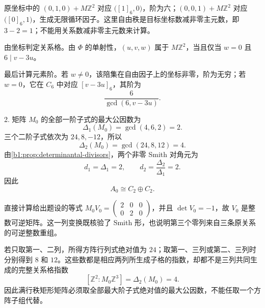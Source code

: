\begin{solution}
	原坐标中的 \((0,1,0)+M\mathbb Z^2\) 对应 \(\bigl([1]_6,0\bigr)\)，阶为六；\((0,0,1)+M\mathbb Z^2\) 对应 \(\bigl([0]_6,1\bigr)\)，生成无限循环因子。这里自由秩是目标坐标数减非零主元数，即 \(3-2=1\)；不能用关系数减非零主元数来计算。

	由坐标判定关系格。由 \(\Phi\) 的单射性，\((u,v,w)\) 属于 \(M\mathbb Z^2\)，当且仅当 \(w=0\) 且 \(6\mid v-3u\)。

	最后计算元素阶。若 \(w\ne0\)，该陪集在自由因子上的坐标非零，阶为无穷；若 \(w=0\)，它在 \(C_6\) 中对应 \([v-3u]_6\)，其阶为
	\[
		\frac{6}{\gcd(6,v-3u)}.
	\]

	2. 矩阵 \(M_0\) 的全部一阶子式的最大公因数为
	\[
		\Delta_1(M_0)=\gcd(4,6,2)=2.
	\]
	三个二阶子式依次为 \(24,8,-12\)，所以
	\[
		\Delta_2(M_0)=\gcd(24,8,12)=4.
	\]
	由\cref{b1:prop:determinantal-divisors}，两个非零 Smith 对角元为
	\[
		d_1=\Delta_1=2,\qquad d_2=\frac{\Delta_2}{\Delta_1}=2.
	\]
	因此
	\[
		A_0\cong C_2\oplus C_2.
	\]

	直接计算给出题设的等式 \(M_0V_0=\begin{pmatrix}2&0&0\\0&2&0\end{pmatrix}\)，并且 \(\det V_0=-1\)，故 \(V_0\) 是整数可逆矩阵。这一列变换既核验了 Smith 形，也说明第三个零列来自三条原关系的可逆整数重组。

	若只取第一、二列，所得方阵行列式绝对值为 \(24\)；取第一、三列或第二、三列时分别得到 \(8\) 和 \(12\)。这些数都是相应两列所生成子格的指数，却都不是三列共同生成的完整关系格指数
	\[
		[\mathbb Z^2:M_0\mathbb Z^3]=\Delta_2(M_0)=4.
	\]
	因此满行秩矩形矩阵必须取全部最大阶子式绝对值的最大公因数，不能任取一个方阵子组代替。
\end{solution}
